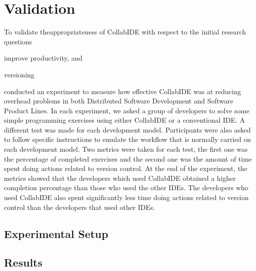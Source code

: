 

\section{Validation}
\label{sec:validation}

To validate theappropriateness of CollabIDE with respect to the initial research questions 
\begin{enumerate*}[label=(\arabic*)]
\item improve productivity, and
\item versioning
\end{enumerate*} conducted an experiment to measure how effective CollabIDE was at reducing overhead problems 
in both Distributed Software Development and Software Product Lines. In each experiment, we asked 
a group of developers to solve some simple programming exercises using either CollabIDE or a 
conventional IDE. A different test was made for each development model. Participants were also 
asked to follow specific instructions to emulate the workflow that is normally carried on each 
development model. Two metrics were taken for each test, the first one was the percentage of 
completed exercises and the second one was the amount of time spent doing actions related to 
version control.
At the end of the experiment, the metrics showed that the developers which used CollabIDE obtained 
a higher completion percentage than those who used the other IDEs. The developers who used 
CollabIDE also spent significantly less time doing actions related to version control than the 
developers that used other IDEs.

\subsection{Experimental Setup}


\subsection{Results}



\endinput